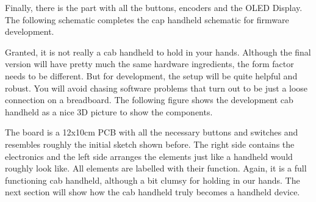 Finally, there is the part with all the buttons, encoders and the OLED Display. The following schematic completes the cap handheld schematic for firmware development.


Granted, it is not really a cab handheld to hold in your hands. Although the final version will have pretty much the same hardware ingredients, the form factor needs to be different. But for development, the setup will be quite helpful and robust. You will avoid chasing software problems that turn out to be just a loose connection on a breadboard. The following figure shows the development cab handheld as a nice 3D picture to show the components.


The board is a 12x10cm PCB with all the necessary buttons and switches and resembles roughly the initial sketch shown before. The right side contains the electronics and the left side arranges the elements just like a handheld would roughly look like. All elements are labelled with their function. Again, it is a full functioning cab handheld, although a bit clumsy for holding in our hands. The next section will show how the cab handheld truly becomes a handheld device.

